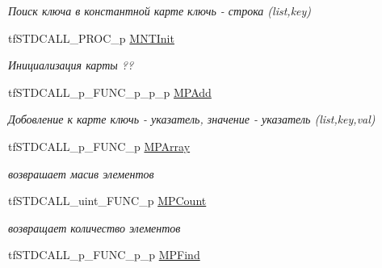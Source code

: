 \begin{DoxyCompactItemize}
\begin{DoxyCompactList}\small\item\em Поиск ключа в константной карте ключь -\/ строка (list,key) \end{DoxyCompactList}\item 
\hypertarget{structs_functions_array_c_p_u_a108e1162d8ed68611ca685e865b03168}{tf\-S\-T\-D\-C\-A\-L\-L\-\_\-\-P\-R\-O\-C\-\_\-p \hyperlink{structs_functions_array_c_p_u_a108e1162d8ed68611ca685e865b03168}{M\-N\-T\-Init}}\label{structs_functions_array_c_p_u_a108e1162d8ed68611ca685e865b03168}

\begin{DoxyCompactList}\small\item\em Инициализация карты ?? \end{DoxyCompactList}\item 
\hypertarget{structs_functions_array_c_p_u_aebd06e784e177029cea7c8a0d8dc9d4f}{tf\-S\-T\-D\-C\-A\-L\-L\-\_\-p\-\_\-\-F\-U\-N\-C\-\_\-p\-\_\-p\-\_\-p \hyperlink{structs_functions_array_c_p_u_aebd06e784e177029cea7c8a0d8dc9d4f}{M\-P\-Add}}\label{structs_functions_array_c_p_u_aebd06e784e177029cea7c8a0d8dc9d4f}

\begin{DoxyCompactList}\small\item\em Добовление к карте ключь -\/ указатель, значение -\/ указатель (list,key,val) \end{DoxyCompactList}\item 
\hypertarget{structs_functions_array_c_p_u_ad21538aaae8fad0491569e83c7881d7b}{tf\-S\-T\-D\-C\-A\-L\-L\-\_\-p\-\_\-\-F\-U\-N\-C\-\_\-p \hyperlink{structs_functions_array_c_p_u_ad21538aaae8fad0491569e83c7881d7b}{M\-P\-Array}}\label{structs_functions_array_c_p_u_ad21538aaae8fad0491569e83c7881d7b}

\begin{DoxyCompactList}\small\item\em возврашает масив элементов \end{DoxyCompactList}\item 
\hypertarget{structs_functions_array_c_p_u_ad193adb7904149fc6edb660144c872ed}{tf\-S\-T\-D\-C\-A\-L\-L\-\_\-uint\-\_\-\-F\-U\-N\-C\-\_\-p \hyperlink{structs_functions_array_c_p_u_ad193adb7904149fc6edb660144c872ed}{M\-P\-Count}}\label{structs_functions_array_c_p_u_ad193adb7904149fc6edb660144c872ed}

\begin{DoxyCompactList}\small\item\em возвращает количество элементов \end{DoxyCompactList}\item 
\hypertarget{structs_functions_array_c_p_u_aab27cb7291f495acb939d9097a7689e8}{tf\-S\-T\-D\-C\-A\-L\-L\-\_\-p\-\_\-\-F\-U\-N\-C\-\_\-p\-\_\-p \hyperlink{structs_functions_array_c_p_u_aab27cb7291f495acb939d9097a7689e8}{M\-P\-Find}}\label{structs_functions_array_c_p_u_aab27cb7291f495acb939d9097a7689e8}


\end{DoxyCompactItemize}
